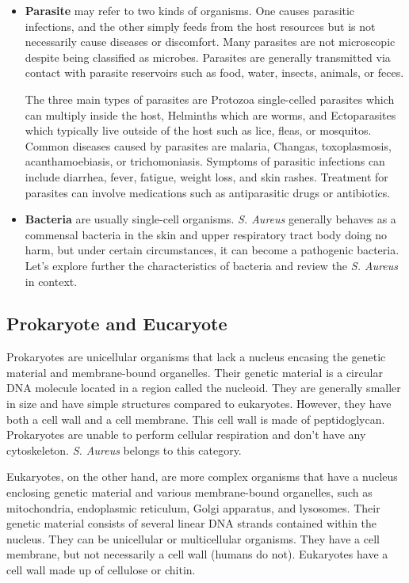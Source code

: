 \begin{itemize}
\item 
\textbf{Parasite} may refer to two kinds of organisms. One causes parasitic infections, and the other simply feeds from the host resources but is not necessarily cause diseases or discomfort. Many parasites are not microscopic despite being classified as microbes. Parasites are generally transmitted via contact with parasite reservoirs such as food, water, insects, animals, or feces.

The three main types of parasites are Protozoa single-celled parasites which can multiply inside the host, Helminths which are worms, and Ectoparasites which typically live outside of the host such as lice, fleas, or mosquitos. Common diseases caused by parasites are malaria, Changas, toxoplasmosis, acanthamoebiasis, or trichomoniasis. Symptoms of parasitic infections can include diarrhea, fever, fatigue, weight loss, and skin rashes. Treatment for parasites can involve medications such as antiparasitic drugs or antibiotics.

\item 
\textbf{Bacteria} are usually single-cell organisms. \textit{S. Aureus} generally behaves as a commensal bacteria in the skin and upper respiratory tract body doing no harm, but under certain circumstances, it can become a pathogenic bacteria. Let's explore further the characteristics of bacteria and review the \textit{S. Aureus} in context.


\end{itemize}

\subsection{Prokaryote and Eucaryote}

Prokaryotes are unicellular organisms that lack a nucleus encasing the genetic material and membrane-bound organelles. Their genetic material is a circular DNA molecule located in a region called the nucleoid. They are generally smaller in size and have simple structures compared to eukaryotes. However, they have both a cell wall and a cell membrane. This cell wall is made of peptidoglycan. Prokaryotes are unable to perform cellular respiration and don't have any cytoskeleton. \textit{S. Aureus} belongs to this category. 


Eukaryotes, on the other hand, are more complex organisms that have a nucleus enclosing genetic material and various membrane-bound organelles, such as mitochondria, endoplasmic reticulum, Golgi apparatus, and lysosomes. Their genetic material consists of several linear DNA strands contained within the nucleus. They can be unicellular or multicellular organisms. They have a cell membrane, but not necessarily a cell wall (humans do not). Eukaryotes have a cell wall made up of cellulose or chitin.


